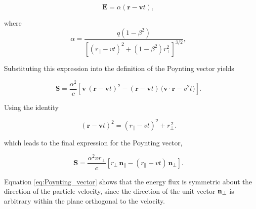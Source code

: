 \documentclass[12pt]{article}
\begin{document}
\[
\mathbf E
=
\alpha(\mathbf r-\mathbf vt),
\]

where
\[
\alpha = \frac{
    q(1-\beta^2)
  }{
    \left[
      (r_\parallel-vt)^2
      +
      (1-\beta^2)r_\perp^2
    \right]^{3/2}
  },
\]

Substituting this expression into the definition of the Poynting vector yields

\[
\mathbf S
=
\frac{\alpha^2}{c}
\left[
\mathbf v\,(\mathbf r-\mathbf vt)^2
-
(\mathbf r-\mathbf vt)\,
\bigl(\mathbf v\cdot\mathbf r-v^2t\bigr)
\right].
\]

Using the identity

\[
(\mathbf r-\mathbf vt)^2
=
(r_{\parallel}-vt)^2
+
r_{\perp}^{\,2}.
\]

which leads to the final expression for the Poynting vector,

\begin{equation}

\mathbf S
=
\frac{\alpha^2 v r_\perp}{c}
\left[
r_\perp\,\mathbf n_\parallel
-
(r_\parallel-vt)\,\mathbf n_\perp
\right].
\label{eq:Poynting_vector}
\end{equation}

Equation \eqref{eq:Poynting_vector} shows that the energy flux is symmetric about the direction of the
particle velocity, since the direction of the unit vector
 $\vb n_\perp$ is arbitrary within the plane orthogonal to the velocity.
\end{document}
